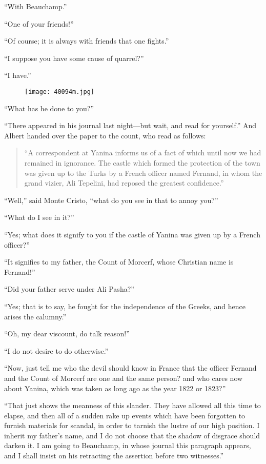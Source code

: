 “With Beauchamp.”

“One of your friends!”

“Of course; it is always with friends that one fights.”

“I suppose you have some cause of quarrel?”

“I have.”

\begin{figure}[ht]
\texttt{[image: 40094m.jpg]}
\end{figure}

“What has he done to you?”

“There appeared in his journal last night—but wait, and read for
yourself.” And Albert handed over the paper to the count, who read as
follows:

\begin{quote}
{\small“A correspondent at Yanina informs us of a fact of which until now we
had remained in ignorance. The castle which formed the protection of
the town was given up to the Turks by a French officer named Fernand,
in whom the grand vizier, Ali Tepelini, had reposed the greatest
confidence.”}
\end{quote}

“Well,” said Monte Cristo, “what do you see in that to annoy you?”

“What do I see in it?”

“Yes; what does it signify to you if the castle of Yanina was given up
by a French officer?”

“It signifies to my father, the Count of Morcerf, whose Christian name
is Fernand!”

“Did your father serve under Ali Pasha?”

“Yes; that is to say, he fought for the independence of the Greeks, and
hence arises the calumny.”

“Oh, my dear viscount, do talk reason!”

“I do not desire to do otherwise.”

“Now, just tell me who the devil should know in France that the officer
Fernand and the Count of Morcerf are one and the same person? and who
cares now about Yanina, which was taken as long ago as the year 1822 or
1823?”

“That just shows the meanness of this slander. They have allowed all
this time to elapse, and then all of a sudden rake up events which have
been forgotten to furnish materials for scandal, in order to tarnish
the lustre of our high position. I inherit my father’s name, and I do
not choose that the shadow of disgrace should darken it. I am going to
Beauchamp, in whose journal this paragraph appears, and I shall insist
on his retracting the assertion before two witnesses.”

